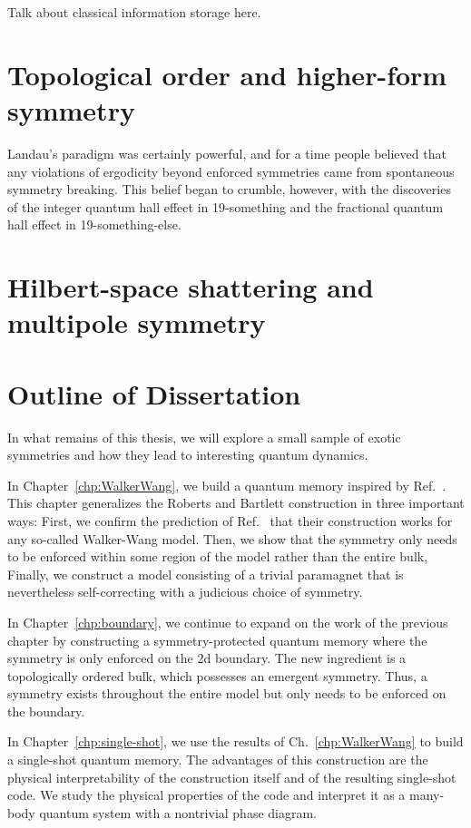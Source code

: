 Talk about classical information storage here.

\section{Topological order and higher-form symmetry}

Landau's paradigm was certainly powerful, and for a time people believed that any violations of ergodicity beyond enforced symmetries came from spontaneous symmetry breaking. This belief began to crumble, however, with the discoveries of the integer quantum hall effect in 19-something and the fractional quantum hall effect in 19-something-else. 

\section{Hilbert-space shattering and multipole symmetry}

\section{Outline of Dissertation}

In what remains of this thesis, we will explore a small sample of exotic symmetries and how they lead to interesting quantum dynamics.

In Chapter~\ref{chp:WalkerWang}, we build a quantum memory inspired by Ref.~\cite{RobertsBartlett2020}. This chapter generalizes the Roberts and Bartlett construction in three important ways: First, we confirm the prediction of Ref.~\cite{RobertsBartlett2020} that their construction works for any so-called Walker-Wang model. Then, we show that the symmetry only needs to be enforced within some region of the model rather than the entire bulk, Finally, we construct a model consisting of a trivial paramagnet that is nevertheless self-correcting with a judicious choice of symmetry.

In Chapter~\ref{chp:boundary}, we continue to expand on the work of the previous chapter by constructing a symmetry-protected quantum memory where the symmetry is only enforced on the 2d boundary. The new ingredient is a topologically ordered bulk, which possesses an emergent symmetry. Thus, a symmetry exists throughout the entire model but only needs to be enforced on the boundary. 

In Chapter~\ref{chp:single-shot}, we use the results of Ch.~\ref{chp:WalkerWang} to build a single-shot quantum memory. The advantages of this construction are the physical interpretability of the construction itself and of the resulting single-shot code. We study the physical properties of the code and interpret it as a many-body quantum system with a nontrivial phase diagram.

